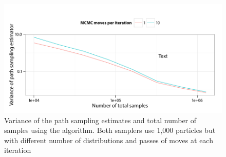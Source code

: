 \begin{figure}[t]
  \linespread{1.1}\selectfont
  \includegraphics[width=\linewidth]{fig_src/MCMC_Iter_Var}
  \caption[Variance of path sampling estimator and total number of samples
  using \protect\smc algorithm]
  {Variance of the path sampling estimates and total number of samples
    using the \smc[2] algorithm. Both samplers use 1,000 particles but with
    different number of distributions and passes of \mcmc moves at each
    iteration}
  \label{fig:fast mcmc iter}
\end{figure}
